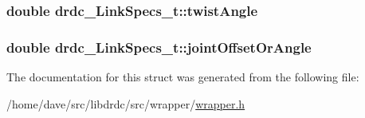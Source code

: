 \hypertarget{structdrdc__LinkSpecs__t_5222246e9e9d580348061c81b6fc9c54}{
\subsubsection[twistAngle]{\setlength{\rightskip}{0pt plus 5cm}double {\bf drdc\_\-LinkSpecs\_\-t::twistAngle}}}
\label{structdrdc__LinkSpecs__t_5222246e9e9d580348061c81b6fc9c54}


\hypertarget{structdrdc__LinkSpecs__t_084534cd7b324bbb2eb8575e163f58d9}{
\subsubsection[jointOffsetOrAngle]{\setlength{\rightskip}{0pt plus 5cm}double {\bf drdc\_\-LinkSpecs\_\-t::jointOffsetOrAngle}}}
\label{structdrdc__LinkSpecs__t_084534cd7b324bbb2eb8575e163f58d9}




The documentation for this struct was generated from the following file:\begin{CompactItemize}
\item 
/home/dave/src/libdrdc/src/wrapper/\hyperlink{wrapper_8h}{wrapper.h}\end{CompactItemize}
